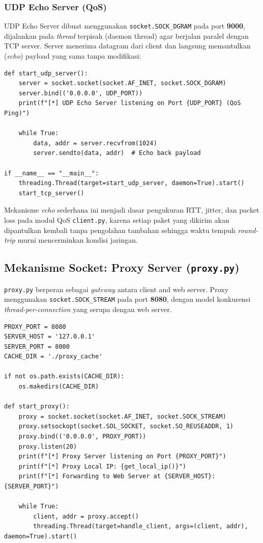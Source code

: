 \documentclass[11pt,a4paper]{article}
\begin{document}
\subsubsection{UDP Echo Server (QoS)}

UDP Echo Server dibuat menggunakan \texttt{socket.SOCK\_DGRAM} pada port \textbf{9000}, dijalankan pada \textit{thread} terpisah (daemon thread) agar berjalan paralel dengan TCP server. Server menerima datagram dari client dan langsung memantulkan (\textit{echo}) payload yang sama tanpa modifikasi:

\begin{lstlisting}[caption={UDP Echo Server pada \texttt{webserver.py}}, label={lst:udp-echo}]
def start_udp_server():
    server = socket.socket(socket.AF_INET, socket.SOCK_DGRAM)
    server.bind(('0.0.0.0', UDP_PORT))
    print(f"[*] UDP Echo Server listening on Port {UDP_PORT} (QoS Ping)")

    while True:
        data, addr = server.recvfrom(1024)
        server.sendto(data, addr)  # Echo back payload

if __name__ == "__main__":
    threading.Thread(target=start_udp_server, daemon=True).start()
    start_tcp_server()
\end{lstlisting}

Mekanisme \textit{echo} sederhana ini menjadi dasar pengukuran RTT, jitter, dan packet loss pada modul QoS \texttt{client.py}, karena setiap paket yang dikirim akan dipantulkan kembali tanpa pengolahan tambahan sehingga waktu tempuh \textit{round-trip} murni mencerminkan kondisi jaringan.

\subsection{Mekanisme Socket: Proxy Server (\texttt{proxy.py})}

\texttt{proxy.py} berperan sebagai \textit{gateway} antara client and web server. Proxy menggunakan \texttt{socket.SOCK\_STREAM} pada port \textbf{8080}, dengan model konkurensi \textit{thread-per-connection} yang serupa dengan web server.

\begin{lstlisting}[caption={Inisialisasi Proxy Server pada \texttt{proxy.py}}, label={lst:proxy-init}]
PROXY_PORT = 8080
SERVER_HOST = '127.0.0.1'
SERVER_PORT = 8000
CACHE_DIR = './proxy_cache'

if not os.path.exists(CACHE_DIR):
    os.makedirs(CACHE_DIR)

def start_proxy():
    proxy = socket.socket(socket.AF_INET, socket.SOCK_STREAM)
    proxy.setsockopt(socket.SOL_SOCKET, socket.SO_REUSEADDR, 1)
    proxy.bind(('0.0.0.0', PROXY_PORT))
    proxy.listen(20)
    print(f"[*] Proxy Server listening on Port {PROXY_PORT}")
    print(f"[*] Proxy Local IP: {get_local_ip()}")
    print(f"[*] Forwarding to Web Server at {SERVER_HOST}:{SERVER_PORT}")

    while True:
        client, addr = proxy.accept()
        threading.Thread(target=handle_client, args=(client, addr), daemon=True).start()
\end{lstlisting}
\end{document}
